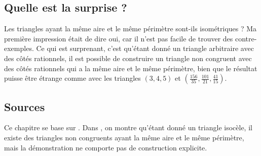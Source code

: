 \subsection*{Quelle est la surprise ?}

Les triangles ayant la même aire et le même périmètre sont-ils isométriques ? Ma première impression était de dire \og oui\fg{}, car il n'est pas facile de trouver des contre-exemples. Ce qui est surprenant, c'est qu'étant donné un triangle arbitraire avec des côtés rationnels, il est possible de construire un triangle non congruent avec des côtés rationnels qui a la même aire et le même périmètre, bien que le résultat puisse être étrange comme avec les triangles $(3,4,5)$ et $\left(\frac{156}{35}, \frac{101}{21}, \frac{41}{15}\right)$.



\subsection*{Sources}

Ce chapitre se base sur \cite{mccallum}. Dans \cite{marita}, on montre qu'étant donné un triangle isocèle, il existe des triangles non congruents ayant la même aire et le même périmètre, mais la démonstration ne comporte pas de construction explicite.
